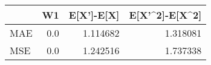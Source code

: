 \begin{tabular}{lrrr}
\toprule
{} &   W1 &  E[X']-E[X] &  E[X'\textasciicircum 2]-E[X\textasciicircum 2] \\
\midrule
MAE &  0.0 &    1.114682 &        1.318081 \\
MSE &  0.0 &    1.242516 &        1.737338 \\
\bottomrule
\end{tabular}
